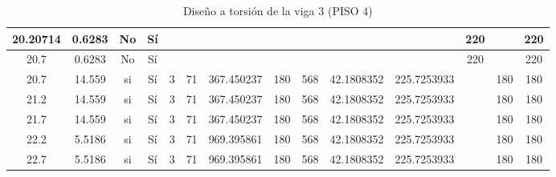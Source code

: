 \begin{table}[H]
{\begin{tabular}{|c|c|c|c|c|c|c|c|c|c|c|c|c|c|}
\hline
20.20714 & 0.6283 & No  & Sí  &     &     &     &     &     &     &     & 220 &     & 220 \bigstrut\\
\hline
20.7 & 0.6283 & No  & Sí  &     &     &     &     &     &     &     & 220 &     & 220 \bigstrut\\
\hline
20.7 & 14.559 & si  & Sí  & 3   & 71  & 367.450237 & 180 & 568 & 42.1808352 & 225.7253933 &     & 180 & 180 \bigstrut\\
\hline
21.2 & 14.559 & si  & Sí  & 3   & 71  & 367.450237 & 180 & 568 & 42.1808352 & 225.7253933 &     & 180 & 180 \bigstrut\\
\hline
21.7 & 14.559 & si  & Sí  & 3   & 71  & 367.450237 & 180 & 568 & 42.1808352 & 225.7253933 &     & 180 & 180 \bigstrut\\
\hline
22.2 & 5.5186 & si  & Sí  & 3   & 71  & 969.395861 & 180 & 568 & 42.1808352 & 225.7253933 &     & 180 & 180 \bigstrut\\
\hline
22.7 & 5.5186 & si  & Sí  & 3   & 71  & 969.395861 & 180 & 568 & 42.1808352 & 225.7253933 &     & 180 & 180 \bigstrut\\
\hline
\end{tabular}%

  }
      \caption{Diseño a torsión de la viga 3 (PISO 4) }
  \label{tab:T VG3 P4 }%
\end{table}%
